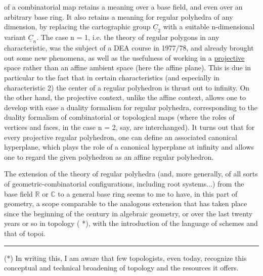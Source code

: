 
of a combinatorial map retains a meaning over a base field, and
even over an arbitrary base ring. It also retains a
meaning for regular polyhedra of any dimension, by
replacing the cartographic group $\underline{C}_2$ with a suitable n-dimensional
variant $\underline{C}_n$. The case n = 1, i.e. the theory of
regular polygons in any characteristic, was the subject
of a DEA course in 1977/78, and already brought out some
new phenomena, as well as the usefulness of working in a \uline{projective}
space rather than an affine ambient space (here the affine plane).
This is due in particular to the fact that in certain
characteristics (and especially in characteristic 2) the
center of a regular polyhedron is thrust out to infinity. On the other
hand, the projective context, unlike the affine context,
allows one to develop with ease a duality formalism for
regular polyhedra, corresponding to the duality formalism
of combinatorial or topological maps (where the roles of vertices
and faces, in the case n = 2, say, are interchanged).
It turns out that for every projective regular polyhedron, one can
define an associated canonical hyperplane, which plays the role of
a canonical hyperplane at infinity and allows one to regard the given
polyhedron as an affine regular polyhedron.

The extension of the theory of regular polyhedra (and,
more generally, of all sorts of geometric-combinatorial
configurations, including root systems...) from the base field
$\mathbb{R}$ or $\mathbb{C}$ to a general base ring seems to me to have,
in this part of geometry, a scope comparable to the analogous
extension that has taken place since the beginning of the century in algebraic
geometry, or over the last twenty years or so in topology ( *),
with the introduction of the language of schemes and that of topoi.

\rule{4cm}{0.4pt}

(*) In writing this, I am aware that few topologists,
even today, recognize this conceptual and technical
broadening of topology and the resources
it offers.


